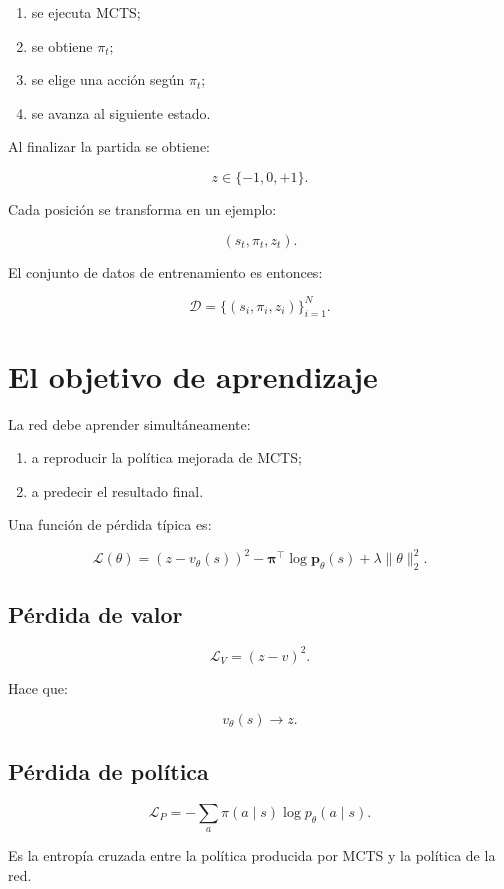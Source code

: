 \documentclass[11pt,a4paper]{article}
\begin{document}
\begin{enumerate}
    \item se ejecuta MCTS;
    \item se obtiene \(\pi_t\);
    \item se elige una acción según \(\pi_t\);
    \item se avanza al siguiente estado.
\end{enumerate}

Al finalizar la partida se obtiene:

\[
z\in\{-1,0,+1\}.
\]

Cada posición se transforma en un ejemplo:

\[
(s_t,\pi_t,z_t).
\]

El conjunto de datos de entrenamiento es entonces:

\[
\mathcal{D}
=
\{(s_i,\pi_i,z_i)\}_{i=1}^{N}.
\]

\section{El objetivo de aprendizaje}

La red debe aprender simultáneamente:

\begin{enumerate}
    \item a reproducir la política mejorada de MCTS;
    \item a predecir el resultado final.
\end{enumerate}

Una función de pérdida típica es:

\[
\mathcal{L}(\theta)
=
(z-v_\theta(s))^2
-
\bm{\pi}^{\top}
\log \bm{p}_\theta(s)
+
\lambda
\|\theta\|_2^2.
\]

\subsection{Pérdida de valor}

\[
\mathcal{L}_V
=
(z-v)^2.
\]

Hace que:

\[
v_\theta(s)\rightarrow z.
\]

\subsection{Pérdida de política}

\[
\mathcal{L}_P
=
-
\sum_a
\pi(a\mid s)
\log p_\theta(a\mid s).
\]

Es la entropía cruzada entre la política producida por MCTS y la política de la red.
\end{document}
